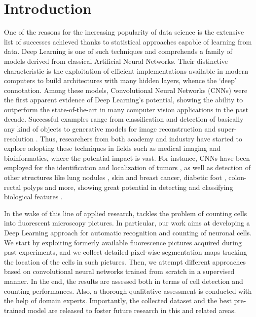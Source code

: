 \chapter{Introduction}
\label{chap:partI_intro}

One of the reasons for the increasing popularity of data science is the extensive list of successes achieved thanks to statistical approaches capable of learning from data.
Deep Learning is one of such techniques and comprehends a family of models derived from classical Artificial Neural Networks. %
Their distinctive characteristic is the exploitation of efficient implementations available in modern computers to build architectures with many hidden layers, whence the `deep' connotation.
Among these models, Convolutional Neural Networks (CNNs) \cite{jimenez, greenspan} were the first apparent evidence of Deep Learning's potential, showing the ability to outperform the state-of-the-art in many computer vision applications in the past decade. 
Successful examples range from classification and detection of basically any kind of objects \cite{AlexNet, YOLO} to generative models for image reconstruction \cite{reconstruction} and super-resolution \cite{super-resolution}.
Thus, researchers from both academy and industry have started to explore adopting these techniques in fields such as medical imaging and bioinformatics, where the potential impact is vast.
For instance, CNNs have been employed for the identification and localization of tumors \cite{brain_tumor,breast_cancer, ciresan2012deep, cirecsan2013mitosis}, as well as detection of other structures like lung nodules \cite{lung_nodules, meraj2020lung, su2021lung}, skin and breast cancer, diabetic foot \cite{TL_medical_imaging}, colon-rectal polyps \cite{korbar} and more, showing great potential in detecting and classifying biological features \cite{lundervold, sahiner, yadav}.

In the wake of this line of applied research,  tackles the problem of counting cells into fluorescent microscopy pictures.
In particular, our work aims at developing a Deep Learning approach for automatic recognition and counting of neuronal cells.
We start by exploiting formerly available fluorescence pictures acquired during past experiments, and we collect detailed pixel-wise segmentation maps tracking the location of the cells in such pictures.
Then, we attempt different approaches based on convolutional neural networks trained from scratch in a supervised manner.
In the end, the results are assessed both in terms of cell detection and counting performances. Also, a thorough qualitative assessment is conducted with the help of domain experts.
Importantly, the collected dataset and the best pre-trained model are released to foster future research in this and related areas. 


